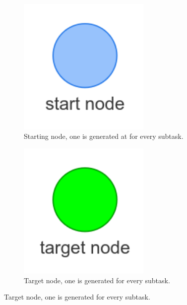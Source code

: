 \begin{figure}[H]
    \begin{subfigure}{0.2\textwidth}
    \centering
    \includegraphics[width=0.7\textwidth]{figures/proposed_method/connecting_nodes/legend/starting_node}
    \caption{Starting node, one is generated at for every subtask.}%
    \end{subfigure}
    \begin{subfigure}{0.2\textwidth}
    \centering
    \includegraphics[width=0.7\textwidth]{figures/proposed_method/connecting_nodes/legend/target_node}
    \caption{Target node, one is generated for every subtask.\newline}%
    \end{subfigure}


\end{figure}
